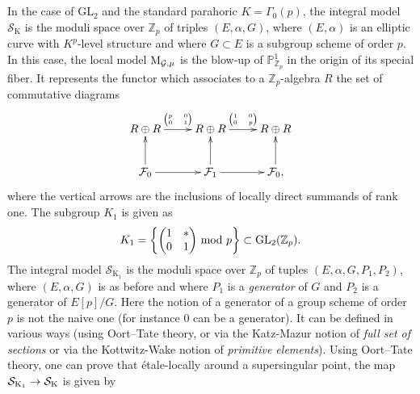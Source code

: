 \documentclass[reqno, 10pt]{amsart}
\makeatletter
\newcommand{\BP}{\ensuremath{\mathbb {P}}\xspace}
\newcommand{\BZ}{\ensuremath{\mathbb {Z}}\xspace}
\newcommand{\CF}{\ensuremath{\mathcal {F}}\xspace}
\newcommand{\CG}{\ensuremath{\mathcal {G}}\xspace}
\newcommand{\CS}{\ensuremath{\mathcal {S}}\xspace}
\newcommand{\RK}{\ensuremath{\mathrm {K}}\xspace}
\newcommand{\GL}{\mathrm{GL}}
\theoremstyle{definition}
\numberwithin{equation}{subsection}
\numberwithin{subsubsection}{subsection}
\renewcommand{\to}{%
   \ifbool{@display}{\longrightarrow}{\rightarrow}%
   }
\newcommand{\Mloc}{{\rm M}}
\makeatother
\begin{document}
\subsection{}
In the case of $\GL_2$ and the standard parahoric $K=\Gamma_0(p)$, the integral model  $\CS_\RK$ is the moduli space over $\BZ_p$ of triples $(E, \alpha, G)$, where $(E, \alpha)$ is an elliptic curve with $K^p$-level structure and where $G\subset E$ is a subgroup scheme of order $p$. In this case, the local model $\Mloc_{\CG,\mu}$ is the blow-up of $\BP^1_{\BZ_p}$ in the origin  of its special fiber. It represents the functor which associates to a $\BZ_p$-algebra $R$ the set of commutative diagrams
\begin{equation}\label{loG2}
\begin{aligned}
\xymatrix{
R \oplus R \ar[r]^{\begin{tiny} \begin{pmatrix} p & 0 \\ 0 & 1 \end{pmatrix} \end{tiny}} & R \oplus R \ar[r]^{\begin{tiny} \begin{pmatrix} 1 & 0 \\ 0 & p \end{pmatrix} \end{tiny}} & R \oplus R \\
\CF_0 \ar[u] \ar[r] & \CF_1 \ar[u] \ar[r] & \CF_0, \ar[u] 
}
\end{aligned}
\end{equation}
where the vertical arrows are the inclusions of  locally direct summands of rank one.
The subgroup $K_1$ is given as
\[
K_1=\left\{\begin{pmatrix}1 &*\\ 0& 1\end{pmatrix}\,{\rm mod}\ p  \right\}\subset \GL_2(\BZ_p). 
\]
The integral model $\CS_{\RK_1}$ is the moduli space over $\BZ_p$ of tuples $(E, \alpha, G, P_1, P_2)$, where $(E, \alpha, G)$ is as before and where $P_1$ is a \emph{generator} of $G$ and $P_2$ is a generator of $E[p]/G$. Here the notion of a generator of a group scheme of order $p$ is not the naive one (for instance $0$ can be a generator). It can be defined in various ways (using Oort--Tate theory, or via the Katz-Mazur notion of \emph{full set of sections} or via the Kottwitz-Wake notion of \emph{primitive elements}).  Using Oort--Tate theory, one can prove that \'etale-locally around a supersingular point, the map $\CS_{\RK_1}\to \CS_\RK$ is given by
\end{document}
